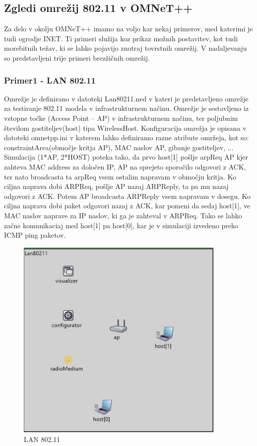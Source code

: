 \documentclass[11pt,a4paper,slovene]{myarticle}
\begin{document}
\subsection{Zgledi omrežij 802.11 v OMNeT++}
Za delo v okolju OMNeT++ imamo na voljo kar nekaj primerov, med katerimi je tudi ogrodje INET. Ti primeri služija koz prikaz možnih postavitev, kot tudi morebitnih težav, ki se lahko pojavijo znotraj tovrstnih omrežij. V nadaljevanju so predstavljeni trije primeri brezžičnih omrežij.
\subsubsection{Primer1 - LAN 802.11}
Omrežje je definirano v datoteki Lan80211.ned v kateri je predstavljeno omrežje za testiranje 802.11 modela v infrastrukturnem načinu. Omrežje je sestavljeno iz vstopne točke (Access Point – AP) v infrastrukturnem načinu, ter poljubnim številom gostiteljev(host) tipa 	WirelessHost. Konfiguracija omrežja je opisana v datoteki omnetpp.ini v katerem lahko definiramo razne atribute omržeja, kot so: constraintArea(območje kritja AP), MAC naslov AP, gibanje gostiteljev, ... Simulacija (1*AP, 2*HOST) poteka tako, da prvo host[1] pošlje arpReq AP kjer zahteva MAC address za določen IP, AP na sprejeto sporočilo odgovori z ACK, ter nato broadcasta ta arpReq vsem ostalim napravam v območju kritja. Ko ciljna naprava dobi ARPReq, pošlje AP nazaj ARPReply, ta pa mu nazaj odgovori z ACK. Potem AP broadcasta 	ARPReply vsem napravam v dosegu. Ko ciljna naprava dobi paket odgovori nazaj z ACK, kar pomeni da sedaj host[1], ve MAC naslov naprave za IP naslov, ki ga je zahteval v ARPReq. Tako se lahko začne komunikaciaj med host[1] pa host[0], kar je v simulaciji izvedeno preko ICMP ping paketov.
\begin{figure}[h!]
	\centering
		\includegraphics[width=0.9\textwidth, keepaspectratio=true]{./images/lan80211.png}
	\caption{LAN 802.11}
	\label{fig:lan80211}
\end{figure}
\end{document}
